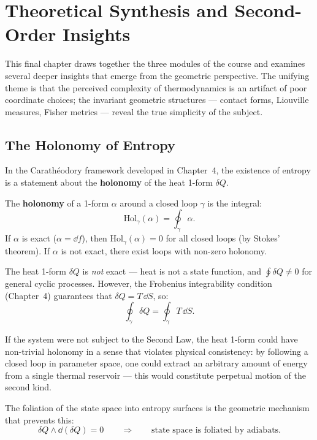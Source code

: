 \chapter{Theoretical Synthesis and Second-Order Insights}

This final chapter draws together the three modules of the course and examines several deeper insights that emerge from the geometric perspective. The unifying theme is that the perceived complexity of thermodynamics is an artifact of poor coordinate choices; the invariant geometric structures --- contact forms, Liouville measures, Fisher metrics --- reveal the true simplicity of the subject.

\section{The Holonomy of Entropy}

In the Carath\'eodory framework developed in Chapter~4, the existence of entropy is a statement about the \textbf{holonomy} of the heat 1-form $\delta Q$.

\begin{definition}
The \textbf{holonomy} of a 1-form $\alpha$ around a closed loop $\gamma$ is the integral:
\begin{equation}
\text{Hol}_\gamma(\alpha) = \oint_\gamma \alpha.
\end{equation}
If $\alpha$ is exact ($\alpha = \dd f$), then $\text{Hol}_\gamma(\alpha) = 0$ for all closed loops (by Stokes' theorem). If $\alpha$ is not exact, there exist loops with non-zero holonomy.
\end{definition}

The heat 1-form $\delta Q$ is \emph{not} exact --- heat is not a state function, and $\oint \delta Q \neq 0$ for general cyclic processes. However, the Frobenius integrability condition (Chapter~4) guarantees that $\delta Q = T\,\dd S$, so:
\begin{equation}
\oint_\gamma \delta Q = \oint_\gamma T\,\dd S.
\end{equation}

If the system were not subject to the Second Law, the heat 1-form could have non-trivial holonomy in a sense that violates physical consistency: by following a closed loop in parameter space, one could extract an arbitrary amount of energy from a single thermal reservoir --- this would constitute perpetual motion of the second kind.

The foliation of the state space into entropy surfaces is the geometric mechanism that prevents this:
\begin{equation}
\delta Q \wedge \dd(\delta Q) = 0 \qquad \Longrightarrow \qquad \text{state space is foliated by adiabats.}
\end{equation}

